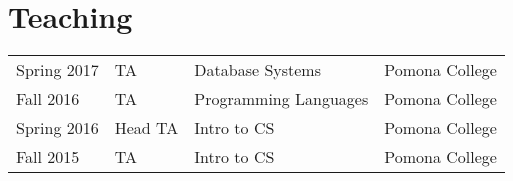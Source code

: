 \documentclass[]{deedy-resume-openfont}
\begin{document}
\begin{minipage}[t]{0.66\textwidth}

\section{Teaching} 

\begin{tabular}{llll}
  Spring 2017 & TA      & Database Systems & Pomona College \\
  Fall   2016 & TA      & Programming Languages & Pomona College \\
  Spring 2016 & Head TA & Intro to CS & Pomona College \\
  Fall   2015 &  TA     & Intro to CS & Pomona College
\end{tabular}
\sectionsep

\end{minipage} 
\end{document}
